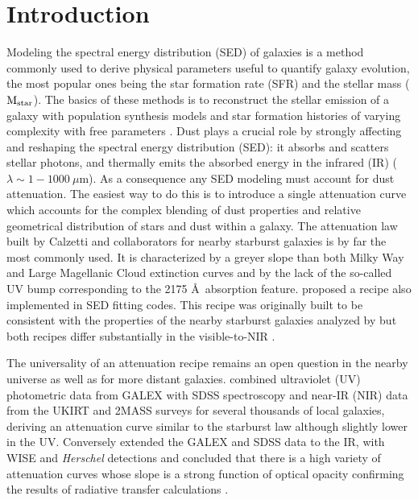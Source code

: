\documentclass{aa}
\begin{document}
\section{Introduction}

Modeling the spectral energy distribution (SED) of galaxies is a method  commonly used to derive physical parameters useful to  quantify  galaxy evolution, the most popular ones being the star formation rate (SFR) and the stellar mass ($\rm M_{star}$). The basics of these methods is to reconstruct the stellar emission of a galaxy with population synthesis models and  star formation histories of varying complexity with free parameters \citep[e.g.,][]{Walcher11, Conroy13}. Dust plays a crucial role  by strongly affecting and reshaping the spectral energy distribution (SED): it absorbs and scatters stellar photons, and thermally emits the absorbed energy in the infrared (IR) ($\lambda \sim 1-1000 ~\mu$m).  As a consequence any SED modeling must account for dust attenuation. The easiest way to do this  is to introduce a single attenuation curve which accounts for the complex blending of dust properties and relative geometrical distribution of stars and dust within a galaxy. The attenuation  law built by Calzetti and collaborators for nearby starburst galaxies \citep{Calzetti94, Calzetti00}  is by far the most commonly used. It is characterized by a greyer slope than both Milky Way  and Large Magellanic Cloud  extinction curves and by the  lack of the {so-called UV bump corresponding} to the 2175 \AA~absorption feature.  \citet{Charlot00} proposed a recipe also implemented in SED fitting codes. This recipe was originally built to be consistent with the properties of the nearby starburst galaxies analyzed  by \citet{Calzetti94} but both recipes differ  substantially in the visible-to-NIR  \citep[][Malek et al. 2018, in press]{Chevallard13, LoFaro17}.

The universality of an attenuation recipe  remains an open question in the nearby universe as well as for more distant galaxies.    \citet{Battisti16, Battisti17}  combined ultraviolet (UV) photometric data from GALEX with SDSS spectroscopy and near-IR (NIR) data from the UKIRT and 2MASS surveys  for several thousands of local galaxies, deriving an attenuation curve  similar to the starburst law although slightly lower in the UV. Conversely \citet{Salim18} extended the GALEX and SDSS data to the IR, with WISE and {\it Herschel}  detections and concluded that there is  a high variety of attenuation curves whose slope is a strong function of optical opacity confirming the results of radiative transfer calculations \citep[e.g.,][]{ Witt00, Pierini04, Tuffs04, Inoue05, Panuzzo07, Chevallard13, Seon16}. \\
\end{document}
